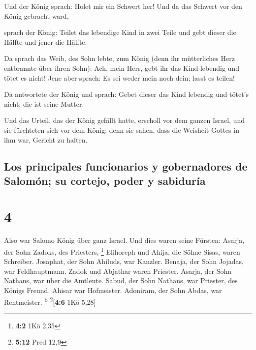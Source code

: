  Und der König sprach: Holet mir ein Schwert her! Und da
das Schwert vor den König gebracht ward,

 sprach der König: Teilet das lebendige Kind in zwei
Teile und gebt dieser die Hälfte und jener die Hälfte.

 Da sprach das Weib, des Sohn lebte, zum König (denn ihr
mütterliches Herz entbrannte über ihren Sohn): Ach, mein Herr, gebt ihr
das Kind lebendig und tötet es nicht! Jene aber sprach: Es sei weder
mein noch dein; lasst es teilen!

 Da antwortete der König und sprach: Gebet dieser das
Kind lebendig und tötet's nicht; die ist seine Mutter.

 Und das Urteil, das der König gefällt hatte, erscholl
vor dem ganzen Israel, und sie fürchteten sich vor dem König; denn sie
sahen, dass die Weisheit Gottes in ihm war, Gericht zu halten.

\hypertarget{los-principales-funcionarios-y-gobernadores-de-salomuxf3n-su-cortejo-poder-y-sabiduruxeda}{%
\subsection{Los principales funcionarios y gobernadores de Salomón; su
cortejo, poder y
sabiduría}\label{los-principales-funcionarios-y-gobernadores-de-salomuxf3n-su-cortejo-poder-y-sabiduruxeda}}

\hypertarget{section-3}{%
\section{4}\label{section-3}}

 Also war Salomo König über ganz Israel. 
Und dies waren seine Fürsten: Asarja, der Sohn Zadoks, des Priesters,
\footnote{\textbf{4:2} 1Kö 2,35}  Elihoreph und Ahija, die
Söhne Sisas, waren Schreiber. Josaphat, der Sohn Ahiluds, war Kanzler.
 Benaja, der Sohn Jojadas, war Feldhauptmann. Zadok und
Abjathar waren Priester.  Asarja, der Sohn Nathans, war
über die Amtleute. Sabud, der Sohn Nathans, war Priester, des Königs
Freund.  Ahisar war Hofmeister. Adoniram, der Sohn Abdas,
war Rentmeister. \textsuperscript{b} \footnote{\textbf{5:12} Pred 12,9}{[}\textbf{4:6}
1Kö 5,28{]}

